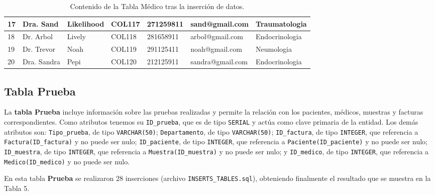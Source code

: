 \documentclass[spanish]{article}
\begin{document}
\begin{table}[H]
{\begin{tabular}{@{}|lllllll|@{}}
17 & Dra. Sand & Likelihood & COL117 & 271259811 & sand@gmail.com & Traumatologia \\ \hline
18 & Dr. Arbol & Lively & COL118 & 281658911 & arbol@gmail.com & Endocrinologia \\ \hline
19 & Dr. Trevor & Noah & COL119 & 291125411 & noah@gmail.com & Neumologia \\ \hline
20 & Dra. Sandra & Pepi & COL120 & 212125911 & sandra@gmail.com & Endocrinologia \\ \hline
\end{tabular}%
}
\caption{Contenido de la Tabla Médico tras la inserción de datos.}
\label{tab:medico}
\end{table}


\subsection{Tabla Prueba}

La \textbf{tabla Prueba} incluye información sobre las pruebas realizadas y permite la relación con los pacientes, médicos, muestras y facturas correspondientes. Como atributos tenemos su \texttt{ID\_prueba}, que es de tipo \texttt{SERIAL} y actúa como clave primaria de la entidad. Los demás atributos son: \texttt{Tipo\_prueba}, de tipo \texttt{VARCHAR(50)}; \texttt{Departamento}, de tipo \texttt{VARCHAR(50)}; \texttt{ID\_factura}, de tipo \texttt{INTEGER}, que referencia a \texttt{Factura(ID\_factura)} y no puede ser nulo; \texttt{ID\_paciente}, de tipo \texttt{INTEGER}, que referencia a \texttt{Paciente(ID\_paciente)} y no puede ser nulo; \texttt{ID\_muestra}, de tipo \texttt{INTEGER}, que referencia a \texttt{Muestra(ID\_muestra)} y no puede ser nulo; y \texttt{ID\_medico}, de tipo \texttt{INTEGER}, que referencia a \texttt{Medico(ID\_medico)} y no puede ser nulo.

En esta tabla \textbf{Prueba} se realizaron 28 inserciones (archivo \texttt{INSERTS\_TABLES.sql}), obteniendo finalmente el resultado que se muestra en la Tabla 5.
\end{document}
